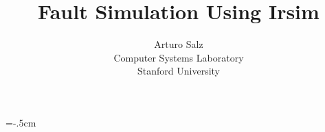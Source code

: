 
\hoffset=-.5cm \voffset=-1cm
\textwidth 16.5cm \textheight 22.5cm
\topmargin -0.5in

\title{Fault Simulation Using Irsim}
\author{Arturo Salz \\
Computer Systems Laboratory \\
Stanford University
}

\begin{titlepage}

\end{titlepage}

\pagestyle{plain}


\maketitle




